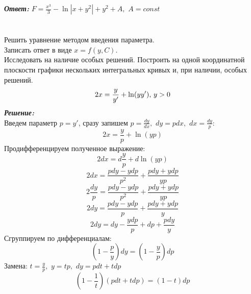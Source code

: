 \documentclass[a5paper, 10pt]{article}
\theoremstyle{definition}
\theoremstyle{plain}
\theoremstyle{remark}
\begin{document}
\textit{\textbf{Ответ:}} $F = \frac{x^3}{3} - \ln |x + y^2| +  y^2 + A, \, \, A = const$









\newpage
\section{}
Решить уравнение методом введения параметра. \\
Записать ответ в виде $x = f(y, C)$.\\
Исследовать на наличие особых решений. Построить на одной координатной плоскости графики нескольких интегральных кривых и, при наличии, особых решений.
\begin{equation*}
2x = \frac{y}{y'} + \ln (yy'), \, y >0\\
\end{equation*}
\textit{\textbf{Решение:}}\\
Введем параметр $p = y'$, сразу запишем $p = \frac{dy}{dx}, \, \, dy = pdx, \, \, dx = \frac{dy}{p}$:
\begin{equation*}
2x = \frac{y}{p} + \ln (yp)
\end{equation*}
Продифференцируем полученное выражение:
\begin{equation*}
2dx = d\frac{y}{p} + d\ln (yp)
\end{equation*}
\begin{equation*}
2dx = \frac{pdy - ydp}{p^2} + \frac{pdy + ydp}{yp}
\end{equation*}
\begin{equation*}
2\frac{dy}{p} = \frac{pdy - ydp}{p^2} + \frac{pdy + ydp}{yp}
\end{equation*}
\begin{equation*}
2dy = \frac{pdy - ydp}{p} + \frac{pdy + ydp}{y}
\end{equation*}
\begin{equation*}
2dy =dy - \frac{ydp}{p} + dp +\frac{pdy}{y}
\end{equation*}
Сгруппируем по дифференциалам:
\begin{equation*}
\left( 1 - \frac{p}{y} \right) dy = \left(1 - \frac{y}{p} \right) dp
\end{equation*}
Замена: $t = \frac{y}{p}, \, \, y = tp, \, \, dy = pdt + tdp$
\begin{equation*}
\left( 1 - \frac{1}{t} \right) ( pdt + tdp) = \left(1 - t \right) dp
\end{equation*}
\end{document}
